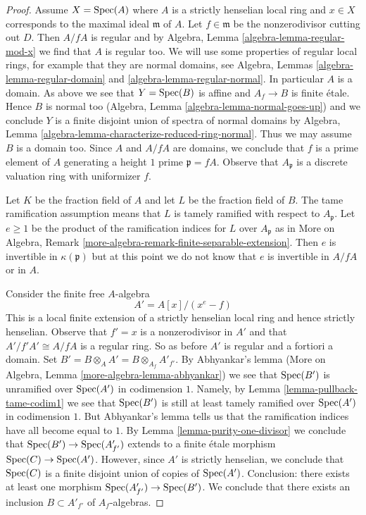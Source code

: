 \begin{proof}
\medskip\noindent
Assume $X = \mathop{\mathrm{Spec}}(A)$ where $A$ is a strictly henselian local ring
and $x \in X$ corresponds to the maximal ideal $\mathfrak m$ of $A$.
Let $f \in \mathfrak m$ be the nonzerodivisor cutting out $D$.
Then $A/fA$ is regular and by Algebra, Lemma \ref{algebra-lemma-regular-mod-x}
we find that $A$ is regular too. We will use some properties of regular
local rings, for example that they are normal domains, see
Algebra, Lemmas \ref{algebra-lemma-regular-domain} and
\ref{algebra-lemma-regular-normal}. In particular $A$ is a domain.
As above we see that $Y = \mathop{\mathrm{Spec}}(B)$ is affine and $A_f \to B$
is finite \'etale. Hence $B$ is normal too
(Algebra, Lemma \ref{algebra-lemma-normal-goes-up})
and we conclude $Y$ is a finite disjoint union of spectra of normal domains by
Algebra, Lemma \ref{algebra-lemma-characterize-reduced-ring-normal}.
Thus we may assume $B$ is a domain too.
Since $A$ and $A/fA$ are domains, we conclude that $f$ is a prime
element of $A$ generating a height $1$ prime $\mathfrak p = fA$.
Observe that $A_\mathfrak p$ is a discrete valuation ring with uniformizer $f$.

\medskip\noindent
Let $K$ be the fraction field of $A$ and let $L$ be the fraction
field of $B$. The tame ramification assumption means that
$L$ is tamely ramified with respect to $A_\mathfrak p$.
Let $e \geq 1$ be the product of the ramification indices for $L$
over $A_\mathfrak p$ as in
More on Algebra, Remark \ref{more-algebra-remark-finite-separable-extension}.
Then $e$ is invertible in $\kappa(\mathfrak p)$ but
at this point we do not know that $e$ is invertible in $A/fA$
or in $A$.

\medskip\noindent
Consider the finite free $A$-algebra
$$
A' = A[x]/(x^e - f)
$$
This is a local finite extension of a strictly henselian local
ring and hence strictly henselian.
Observe that $f' = x$ is a nonzerodivisor in $A'$ and that
$A'/f'A' \cong A/fA$ is a regular ring. So as before $A'$
is regular and a fortiori a domain. Set
$B' = B \otimes_A A' = B \otimes_{A_f} A'_{f'}$.
By Abhyankar's lemma
(More on Algebra, Lemma \ref{more-algebra-lemma-abhyankar})
we see that $\mathop{\mathrm{Spec}}(B')$ is unramified over $\mathop{\mathrm{Spec}}(A')$
in codimension $1$. Namely, by Lemma \ref{lemma-pullback-tame-codim1}
we see that $\mathop{\mathrm{Spec}}(B')$ is still at least tamely ramified
over $\mathop{\mathrm{Spec}}(A')$ in codimension $1$. But Abhyankar's lemma
tells us that the ramification indices have all become equal to $1$.
By Lemma \ref{lemma-purity-one-divisor} we conclude that
$\mathop{\mathrm{Spec}}(B') \to \mathop{\mathrm{Spec}}(A'_{f'})$ extends to a finite \'etale morphism
$\mathop{\mathrm{Spec}}(C) \to \mathop{\mathrm{Spec}}(A')$. However, since $A'$ is strictly henselian,
we conclude that $\mathop{\mathrm{Spec}}(C)$ is a finite disjoint union of copies
of $\mathop{\mathrm{Spec}}(A')$. Conclusion: there exists at least one morphism
$\mathop{\mathrm{Spec}}(A'_{f'}) \to \mathop{\mathrm{Spec}}(B')$. We conclude that there exists
an inclusion $B \subset A'_{f'}$ of $A_f$-algebras.


\end{proof}
